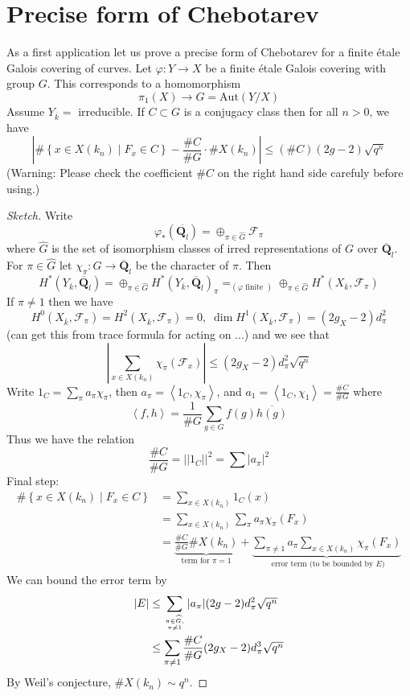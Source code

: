 \section{Precise form of Chebotarev}
\label{section-chebotarev}

\noindent
As a first application let us prove a precise form of Chebotarev
for a finite \'etale Galois covering of curves.
Let $\varphi : Y \to X$ be a finite \'etale Galois covering with
group $G$. This corresponds to a homomorphism
$$
\pi_1(X) \longrightarrow G = \text{Aut}(Y/X)
$$
Assume $Y_{\overline k} = $ irreducible. If $C\subset G$ is a conjugacy
class then for all $n>0$, we have
$$
\left|
\#\left\{x \in X(k_n) \mid F_x \in C \right\} -
\frac{\# C}{\# G} \cdot \# X(k_n)
\right|
\leq
(\# C)(2g - 2) \sqrt{q^n}
$$
(Warning: Please check the coefficient $\# C$ on the right hand side
carefuly before using.)

\begin{proof}[Sketch]
Write
$$
\varphi_*(\overline{\mathbf{Q}_l}) =
\oplus_{\pi \in \widehat G} \mathcal{F}_{\pi}
$$
where $\widehat G$ is the set of isomorphism
classes of irred representations of
$G$ over $\overline{\mathbf{Q}}_l$. For $\pi \in \widehat G$
let $\chi_{\pi}: G \to \overline{\mathbf{Q}}_l$
be the character of $\pi$. Then
$$
H^*(Y_{\overline k}, \overline{\mathbf{Q}}_l) =
\oplus_{\pi\in \widehat G}
H^*(Y_{\overline k}, \overline{\mathbf{Q}}_l)_\pi
=_{(\varphi\text{ finite })}
\oplus_{\pi\in \widehat G}
H^*(X_{\overline k}, \mathcal{F}_\pi)
$$
If $\pi\neq 1$ then we have
$$
H^0(X_{\overline k}, \mathcal{F}_\pi) = H^2(X_{\overline k},
\mathcal{F}_\pi)=0, \; \dim H^1(X_{\overline k}, \mathcal{F}_\pi) =
(2g_X-2)d_\pi^2
$$
(can get this from trace formula for acting on ...) and we see that
$$
\left|\sum_{x \in X(k_n)} \chi_\pi(\mathcal{F}_x)\right|
\leq
(2g_X - 2) d_\pi^2\sqrt{q^n}
$$
Write $1_C = \sum_\pi a_\pi \chi_\pi$, then
$a_\pi = \left<1_C, \chi_\pi\right>$, and
$a_1 = \left<1_C, \chi_1\right> = \frac{\# C}{\# G}$ where
$$
\left<f, h\right> = \frac{1}{\# G}\sum_{g \in G} f(g)\overline{h(g)}
$$
Thus we have the relation
$$
\frac{\# C}{\# G} = ||1_C||^2 = \sum|a_\pi|^2
$$
Final step:
\begin{align*}
\#\left\{x \in X(k_n) \mid F_x \in C\right\}
& =
\sum_{x \in X(k_n)} 1_C(x) \\
& =
\sum_{x \in X(k_n)} \sum_\pi a_\pi \chi_\pi(F_x) \\
& =
\underbrace{\frac{\# C}{\# G} \# X(k_n)}_{
\text{term for }\pi = 1}
+
\underbrace{\sum_{\pi\neq 1}a_\pi\sum_{x\in X(k_n)}\chi_\pi(F_x)}_{
\text{ error term (to be bounded by $E$)}}
\end{align*}
We can bound the error term by
\begin{align*}
|E|
& \leq
\sum_{\pi \in \widehat G, \atop \pi \neq 1}
|a_\pi| (2g - 2) d_\pi^2 \sqrt{q^n} \\
& \leq
\sum_{\pi \neq 1} \frac{\# C}{\# G} (2g_X - 2) d_\pi^3 \sqrt{q^n}
\end{align*}
By Weil's conjecture, $\# X(k_n)\sim q^n$.
\end{proof}



